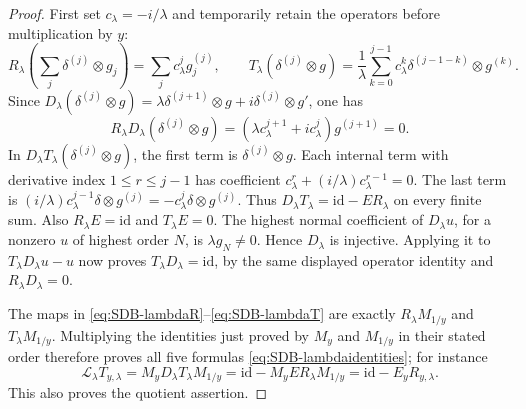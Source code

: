 \begin{proof}
First set $c_\lambda=-i/\lambda$ and temporarily retain the
operators before multiplication by $y$:
\[
 R_\lambda\!\left(\sum_j\delta^{(j)}\otimes g_j\right)
       =\sum_j c_\lambda^j g_j^{(j)},\qquad
 T_\lambda(\delta^{(j)}\otimes g)
       =\frac1\lambda\sum_{k=0}^{j-1}
           c_\lambda^k\delta^{(j-1-k)}\otimes g^{(k)}.
\]
Since
$D_\lambda(\delta^{(j)}\otimes g)
=\lambda\delta^{(j+1)}\otimes g+i\delta^{(j)}\otimes g'$,
one has
\[
 R_\lambda D_\lambda(\delta^{(j)}\otimes g)
      =(\lambda c_\lambda^{j+1}+i c_\lambda^j)g^{(j+1)}=0.
\]
In $D_\lambda T_\lambda(\delta^{(j)}\otimes g)$, the first
term is $\delta^{(j)}\otimes g$. Each internal term with derivative
index $1\leq r\leq j-1$ has coefficient
$c_\lambda^r+(i/\lambda)c_\lambda^{r-1}=0$.
The last term is
$(i/\lambda)c_\lambda^{j-1}\delta\otimes g^{(j)}
=-c_\lambda^j\delta\otimes g^{(j)}$.
Thus $D_\lambda T_\lambda=\mathrm{id}-ER_\lambda$ on every
finite sum. Also $R_\lambda E=\mathrm{id}$ and $T_\lambda E=0$.
The highest normal coefficient of $D_\lambda u$, for a nonzero
$u$ of highest order $N$, is $\lambda g_N\ne0$. Hence
$D_\lambda$ is injective. Applying it to
$T_\lambda D_\lambda u-u$ now proves
$T_\lambda D_\lambda=\mathrm{id}$, by the same displayed
operator identity and $R_\lambda D_\lambda=0$.

The maps in \eqref{eq:SDB-lambdaR}--\eqref{eq:SDB-lambdaT} are
exactly $R_\lambda M_{1/y}$ and $T_\lambda M_{1/y}$.
Multiplying the identities just proved by $M_y$ and $M_{1/y}$
in their stated order therefore proves all five formulas
\eqref{eq:SDB-lambdaidentities}; for instance
\[
 \mathcal L_\lambda T_{y,\lambda}
 =M_yD_\lambda T_\lambda M_{1/y}
 =\mathrm{id}-M_yER_\lambda M_{1/y}
 =\mathrm{id}-E_yR_{y,\lambda}.
\]
This also proves the quotient assertion.


\end{proof}
